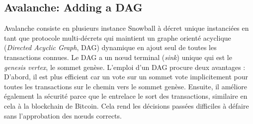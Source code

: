\subsection{Avalanche: Adding a DAG}%

Avalanche consiste en plusieurs instance Snowball à décret unique instanciées en tant que protocole multi-décrets qui maintient un graphe orienté acyclique (\emph{Directed Acyclic Graph},  DAG) dynamique en ajout seul de toutes les transactions connues.
Le DAG a un nœud terminal (\emph{sink}) unique qui est le \emph{genesis vertex}, le sommet genèse. %
L'emploi d'un DAG procure deux avantages :
D'abord, il est plus efficient car un vote sur un sommet vote implicitement pour toutes les transactions sur le chemin vers le sommet genèse.
Ensuite, il améliore également la sécurité parce que le entrelace le sort des transactions, similaire en cela à la blockchain de Bitcoin.
Cela rend les décisions passées difficiles à défaire sans l'approbation des nœuds corrects.


